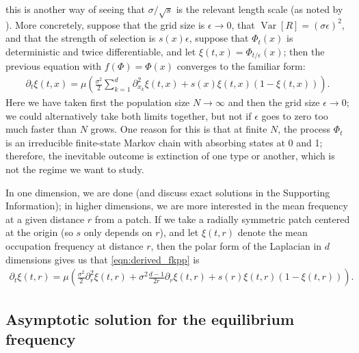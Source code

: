 \documentclass[10pt,letterpaper]{article}
\newcommand{\citet}[1]{\cite{#1}}
\DeclareMathOperator{\var}{Var}
\begin{document}
this is another way of seeing that $\sigma/\sqrt{s}$ is the relevant length scale (as noted by \citet{slatkin1973geneflow}).
More concretely, suppose that the grid size is $\epsilon \to 0$, 
that $\var[R] = (\sigma \epsilon)^2$, and that the strength of selection is $s(x) \epsilon$,
suppose that $\Phi_t(x)$ is deterministic and twice differentiable,
and let $\xi(t,x) = \Phi_{t/\epsilon}(x)$;
then the previous equation with $f(\Phi) = \Phi(x)$ converges to the familiar form:
\begin{align}
  \label{eqn:derived_fkpp}
  \partial_t \xi(t,x) = \mu \left( \frac{\sigma^2}{2} \sum_{k=1}^d \partial_{x_k}^2 \xi(t,x) + s(x) \xi(t,x) (1-\xi(t,x)) \right) .
\end{align}
Here we have taken first the population size $N \to \infty$ and then the grid size $\epsilon \to 0$;
we could alternatively take both limits together, but not if $\epsilon$ goes to zero too much faster than $N$ grows.
One reason for this is that at finite $N$,
the process $\Phi_t$ is an irreducible finite-state Markov chain with absorbing states at 0 and 1;
therefore, the inevitable outcome is extinction of one type or another,
which is not the regime we want to study.

In one dimension, we are done (and discuss exact solutions in the Supporting Information);
in higher dimensions, we are more interested in the mean frequency at a given distance $r$ from a patch.
If we take a radially symmetric patch centered at the origin (so $s$ only depends on $r$), 
and let $\xi(t,r)$ denote the mean occupation frequency at distance $r$,
then the polar form of the Laplacian in $d$ dimensions gives us that \eqref{eqn:derived_fkpp} is
\begin{align}
  \label{eqn:radial_fkpp}
  \partial_t \xi(t,r) = \mu \left( \frac{\sigma^2}{2} \partial_{r}^2 \xi(t,r) + \sigma^2\frac{d-1}{2r} \partial_r \xi(t,r) + s(r) \xi(t,r) (1-\xi(t,r)) \right) .
\end{align}


\subsection[Asymptotics]{Asymptotic solution for the equilibrium frequency} 
\label{apx:asymptotics}
\end{document}
